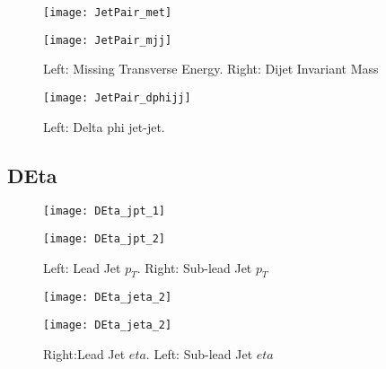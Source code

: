 \documentclass[a4paper,10pt]{article}
\begin{document}
\begin{figure}[!h]
\centering
\begin{minipage}[!h]{0.4\linewidth}
\centering
\texttt{[image: JetPair\_met]}
\end{minipage}%
\begin{minipage}[!h]{0.4\linewidth}
\centering
\texttt{[image: JetPair\_mjj]}
\end{minipage}
\caption{Left: Missing Transverse Energy. Right: Dijet Invariant Mass}
\end{figure}

\begin{figure}[!h]
\centering
\begin{minipage}[!h]{0.4\linewidth}
\centering
\texttt{[image: JetPair\_dphijj]}
\end{minipage}%
\begin{minipage}[!h]{0.4\linewidth}
\centering
\end{minipage}
\caption{Left: Delta phi jet-jet.}
\end{figure}

\clearpage
\subsection{DEta}

\begin{figure}[!h]
\centering
\begin{minipage}[!h]{0.4\linewidth}
\centering
\texttt{[image: DEta\_jpt\_1]}
\end{minipage}%
\begin{minipage}[!h]{0.4\linewidth}
  \texttt{[image: DEta\_jpt\_2]}
\end{minipage}
\caption{Left: Lead Jet $p_T$. Right: Sub-lead Jet $p_T$}
\end{figure}

\begin{figure}[!h]
\centering
\begin{minipage}[!h]{0.4\linewidth}
\centering
\texttt{[image: DEta\_jeta\_2]}
\end{minipage}%
\begin{minipage}[!h]{0.4\linewidth}
\centering
\texttt{[image: DEta\_jeta\_2]}
\end{minipage}
\caption{Right:Lead Jet $eta$. Left: Sub-lead Jet $eta$}
\end{figure}
\end{document}
